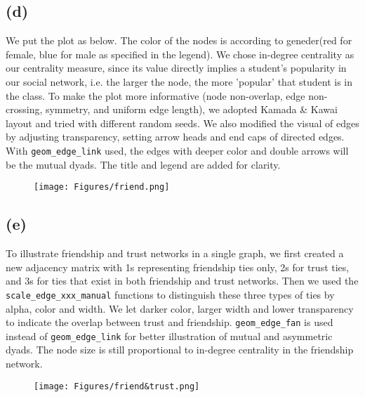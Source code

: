 \documentclass[11pt]{article}
\begin{document}
\subsection*{(d)}
We put the plot as below. The color of the nodes is according to geneder(red for female, blue for male as specified in the legend). We chose in-degree centrality as our centrality measure, since its value directly implies a student's popularity in our social network, i.e. the larger the node, the more 'popular' that student is in the class. To make the plot more informative (node non-overlap, edge non-crossing, symmetry, and uniform edge length), we adopted Kamada \& Kawai layout and tried with different random seeds. We also modified the visual of edges by adjusting transparency, setting arrow heads and end caps of directed edges. With \texttt{geom\_edge\_link} used, the edges with deeper color and double arrows will be the mutual dyads. The title and legend are added for clarity.

\begin{center}
\begin{figure}[H]
    \centering
    \texttt{[image: Figures/friend.png]}
    \caption{}
    \label{fig:friend}
\end{figure}
\end{center}

\subsection*{(e)}
To illustrate friendship and trust networks in a single graph, we first created a new adjacency matrix with 1s representing friendship ties only, 2s for trust ties, and 3s for ties that exist in both friendship and trust networks. Then we used the \texttt{scale\_edge\_xxx\_manual} functions to distinguish these three types of ties by alpha, color and width. We let darker color, larger width and lower transparency to indicate the overlap between trust and friendship. \texttt{geom\_edge\_fan} is used instead of \texttt{geom\_edge\_link} for better illustration of mutual and asymmetric dyads. The node size is still proportional to in-degree centrality in the friendship network.
\begin{center}
\begin{figure}[H]
    \centering
    \texttt{[image: Figures/friend\&trust.png]}
    \caption{}
    \label{fig:friend&trust}
\end{figure}
\end{center}
\end{document}
